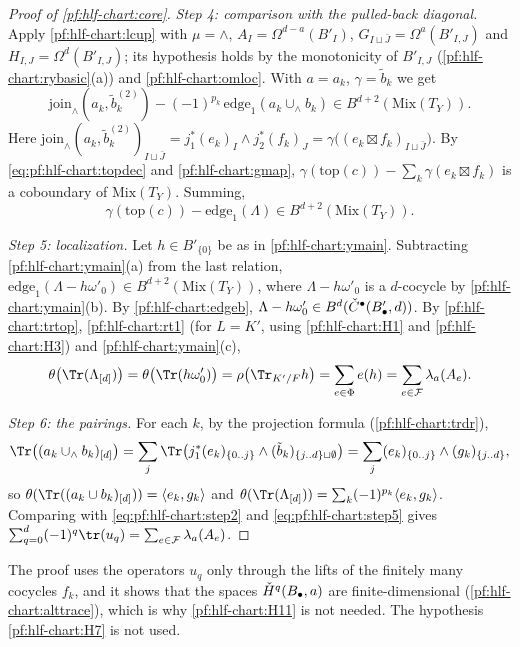 \begin{proof}[Proof of \cref{pf:hlf-chart:core}]
\emph{Step 4: comparison with the pulled-back diagonal.} Apply \cref{pf:hlf-chart:lcup} with $\mu=\wedge$, $A_I=\Omega^{d-a}(B'_I)$,
$G_{I\sqcup\bar J}=\Omega^a(B'_{I,J})$ and $H_{I,J}=\Omega^d(B'_{I,J})$; its hypothesis holds by the monotonicity of $B'_{I,J}$
(\cref{pf:hlf-chart:rybasic}(a)) and \cref{pf:hlf-chart:omloc}. With $a=a_k$, $\gamma=\tilde b_k$ we get
\[
  \mathrm{join}_\wedge(a_k,\tilde b_k^{(2)})-(-1)^{p_k}\,\mathrm{edge}_1(a_k\cup_\wedge b_k)\in B^{d+2}(\mathrm{Mix}(T_Y)).
\]
Here $\mathrm{join}_\wedge(a_k,\tilde b_k^{(2)})_{I\sqcup\bar J}=j_1^*(e_k)_I\wedge j_2^*(f_k)_J=\gamma\bigl((e_k\boxtimes f_k)_{I\sqcup\bar J}\bigr)$. By
\eqref{eq:pf:hlf-chart:topdec} and \cref{pf:hlf-chart:gmap}, $\gamma(\mathrm{top}(c))-\sum_k\gamma(e_k\boxtimes f_k)$ is a coboundary of
$\mathrm{Mix}(T_Y)$. Summing,
\[
  \gamma(\mathrm{top}(c))-\mathrm{edge}_1(\Lambda)\in B^{d+2}(\mathrm{Mix}(T_Y)).
\]

\emph{Step 5: localization.} Let $h\in B'_{\{0\}}$ be as in \cref{pf:hlf-chart:ymain}. Subtracting \cref{pf:hlf-chart:ymain}(a) from the last relation,
$\mathrm{edge}_1(\Lambda-h\omega'_0)\in B^{d+2}(\mathrm{Mix}(T_Y))$, where $\Lambda-h\omega'_0$ is a $d$-cocycle by \cref{pf:hlf-chart:ymain}(b). By
\cref{pf:hlf-chart:edgeb}, $\Lambda-h\omega'_0\in B^d(\check{C}^\bullet(B'_\bullet,d))$. By \cref{pf:hlf-chart:trtop}, \cref{pf:hlf-chart:rt1} (for $L=K'$,
using \ref{pf:hlf-chart:H1} and \ref{pf:hlf-chart:H3}) and \cref{pf:hlf-chart:ymain}(c),
\begin{equation}\label{eq:pf:hlf-chart:step5}
  \theta\bigl(\Tr(\Lambda_{[d]})\bigr)=\theta\bigl(\Tr(h\omega'_0)\bigr)=\rho\bigl(\Tr_{K'/F}h\bigr)=\sum_{e\in\hlfcfib}e(h)=\sum_{e\in\mathcal F}\hlfcloc_a(A_e).
\end{equation}

\emph{Step 6: the pairings.} For each $k$, by the projection formula (\cref{pf:hlf-chart:trdr}),
\[
  \Tr\bigl((a_k\cup_\wedge b_k)_{[d]}\bigr)=\sum_j\Tr\bigl(j_1^*(e_k)_{\{0..j\}}\wedge(\tilde b_k)_{\{j..d\}\sqcup\emptyset}\bigr)
  =\sum_j(e_k)_{\{0..j\}}\wedge(g_k)_{\{j..d\}},
\]
so $\theta(\Tr((a_k\cup b_k)_{[d]}))=\langle e_k,g_k\rangle$ and $\theta(\Tr(\Lambda_{[d]}))=\sum_k(-1)^{p_k}\langle e_k,g_k\rangle$. Comparing with
\eqref{eq:pf:hlf-chart:step2} and \eqref{eq:pf:hlf-chart:step5} gives $\sum_{q=0}^d(-1)^q\tr(u_q)=\sum_{e\in\mathcal F}\hlfcloc_a(A_e)$.
\end{proof}

\begin{remark}[Scope]\label{pf:hlf-chart:rem:scope}
The proof uses the operators $u_q$ only through the lifts of the finitely many cocycles $f_k$, and it shows that the spaces $\check{H}^q(B_\bullet,a)$
are finite-dimensional (\cref{pf:hlf-chart:alttrace}), which is why \ref{pf:hlf-chart:H11} is not needed. The hypothesis \ref{pf:hlf-chart:H7} is
not used.
\end{remark}
